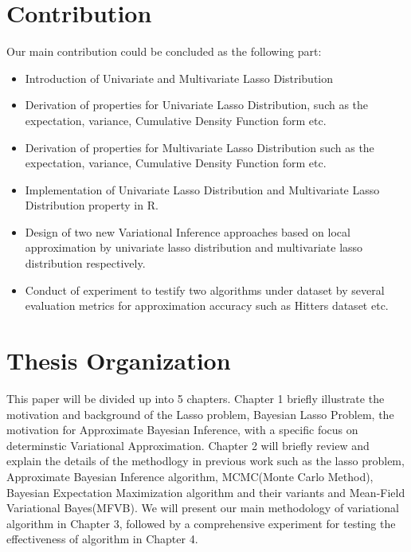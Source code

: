 \section{Contribution}
\label{cont}
Our main contribution could be concluded as the following part:
\begin{itemize}
	\item Introduction of Univariate and Multivariate Lasso Distribution
	\item Derivation of properties for Univariate Lasso Distribution, such as the expectation, variance, Cumulative Density Function form etc.
	\item Derivation of properties for Multivariate Lasso Distribution such as the expectation, variance, Cumulative Density Function form etc.
	\item Implementation of Univariate Lasso Distribution and Multivariate Lasso Distribution property in R.
	\item Design of two new Variational Inference approaches based on local approximation by univariate lasso distribution and multivariate lasso distribution respectively.
	\item Conduct of experiment to testify two algorithms under dataset by several evaluation metrics for approximation accuracy such as Hitters dataset etc.
\end{itemize}



\section{Thesis Organization}
This paper will be divided up into 5 chapters. Chapter 1 briefly illustrate the motivation and background of the Lasso problem, Bayesian Lasso Problem, the motivation for Approximate Bayesian Inference, with a specific focus on determinstic  Variational Approximation. Chapter 2 will briefly review and explain the details of the methodlogy in previous work such as the lasso problem, Approximate Bayesian Inference algorithm, MCMC(Monte Carlo Method), Bayesian Expectation Maximization algorithm and their variants and Mean-Field Variational Bayes(MFVB). We will present our main methodology of variational algorithm in Chapter 3, followed by a comprehensive experiment for testing the effectiveness of algorithm in Chapter 4. 



 